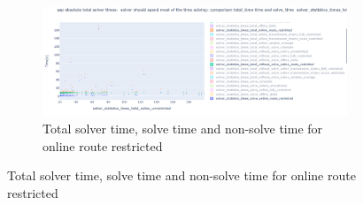 \documentclass{article}
\begin{document}
\begin{figure}[hbtp]
\begin{subfigure}{\textwidth}
         \label{fig:computationtimes_solve_non_solve_time_online_delta}
    \end{subfigure}
    \begin{subfigure}{\textwidth}
        \includegraphics[width=\textwidth]{Figures/04_computational_results/solve_non_solve_online_route_restricted.PNG}
        \caption{Total solver time, solve time and non-solve time for online route restricted}
         \label{fig:computationtimes_solve_non_solve_time_online_route_restricted}
    \end{subfigure}
\end{figure}
\end{document}
